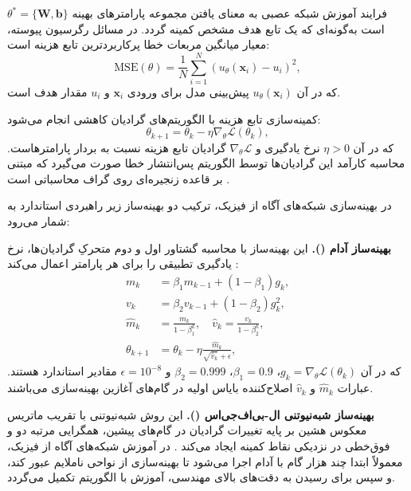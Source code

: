 فرایند آموزش شبکه عصبی به معنای یافتن مجموعه پارامترهای بهینه $\theta^* = \{\mathbf{W}, \mathbf{b}\}$ است به‌گونه‌ای که یک تابع هدف مشخص کمینه گردد. در مسائل رگرسیون پیوسته، معیار میانگین مربعات خطا پرکاربردترین تابع هزینه است:
\begin{equation}
\mathrm{MSE}(\theta) = \frac{1}{N}\sum_{i=1}^{N} \left(u_\theta(\mathbf{x}_i) - u_i\right)^2,
\label{eq:mse}
\end{equation}
که در آن $u_\theta(\mathbf{x}_i)$ پیش‌بینی مدل برای ورودی $\mathbf{x}_i$ و $u_i$ مقدار هدف است.

کمینه‌سازی تابع هزینه با الگوریتم‌های گرادیان کاهشی انجام می‌شود:
\begin{equation}
\theta_{k+1} = \theta_k - \eta \nabla_\theta \mathcal{L}(\theta_k),
\label{eq:gd}
\end{equation}
که در آن $\eta > 0$ نرخ یادگیری و $\nabla_\theta \mathcal{L}$ گرادیان تابع هزینه نسبت به بردار پارامترهاست. محاسبه کارآمد این گرادیان‌ها توسط الگوریتم پس‌انتشار خطا صورت می‌گیرد که مبتنی بر قاعده زنجیره‌ای روی گراف محاسباتی است \cite{rumelhart1986}.

در بهینه‌سازی شبکه‌های آگاه از فیزیک، ترکیب دو بهینه‌ساز زیر راهبردی استاندارد به شمار می‌رود:

\textbf{بهینه‌ساز آدام ().} این بهینه‌ساز با محاسبه گشتاور اول و دوم متحرکِ گرادیان‌ها، نرخ یادگیری تطبیقی را برای هر پارامتر اعمال می‌کند \cite{kingma2015}:
\begin{equation}
\begin{aligned}
m_k &= \beta_1 m_{k-1} + (1-\beta_1) g_k, \\
v_k &= \beta_2 v_{k-1} + (1-\beta_2) g_k^2, \\
\hat{m}_k &= \frac{m_k}{1-\beta_1^k}, \quad \hat{v}_k = \frac{v_k}{1-\beta_2^k}, \\
\theta_{k+1} &= \theta_k - \eta \frac{\hat{m}_k}{\sqrt{\hat{v}_k} + \epsilon},
\end{aligned}
\label{eq:adam}
\end{equation}
که در آن $g_k = \nabla_\theta \mathcal{L}(\theta_k)$، $\beta_1=0.9$، $\beta_2=0.999$ و $\epsilon=10^{-8}$ مقادیر استاندارد هستند. عبارات $\hat{m}_k$ و $\hat{v}_k$ اصلاح‌کننده بایاس اولیه در گام‌های آغازین بهینه‌سازی می‌باشند.

\textbf{بهینه‌ساز شبه‌نیوتنی ال-بی‌اف‌جی‌اس ().} این روش شبه‌نیوتنی با تقریب ماتریس معکوس هشین بر پایه تغییرات گرادیان در گام‌های پیشین، همگرایی مرتبه دو و فوق‌خطی در نزدیکی نقاط کمینه ایجاد می‌کند \cite{liu1989}. در آموزش شبکه‌های آگاه از فیزیک، معمولاً ابتدا چند هزار گام با آدام اجرا می‌شود تا بهینه‌سازی از نواحی ناملایم عبور کند، و سپس برای رسیدن به دقت‌های بالای مهندسی، آموزش با الگوریتم  تکمیل می‌گردد.

